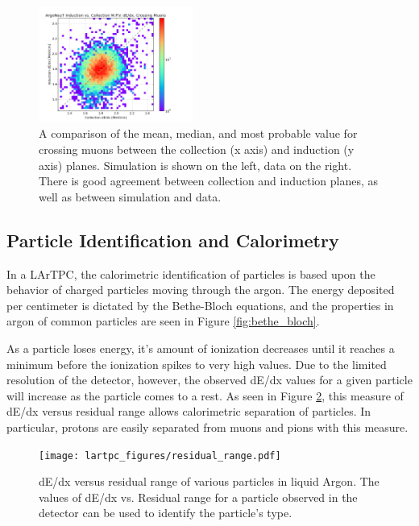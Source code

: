 \begin{figure}[p]
  \includegraphics[width=0.45\textwidth]{lartpc_figures/mpv_coll_vs_ind_data.png}
  \caption[Cross Plane Calibration Checks]{A comparison of the mean, median, and most probable value for crossing muons between the collection (x axis) and induction (y axis) planes.  Simulation is shown on the left, data on the right.  There is good agreement between collection and induction planes, as well as between simulation and data.}
  \label{fig:coll_ind_differences}
\end{figure}

\subsection{Particle Identification and Calorimetry}

In a LArTPC, the calorimetric identification of particles is based upon the behavior of charged particles moving through the argon.  The energy deposited per centimeter is dictated by the Bethe-Bloch equations, and the properties in argon of common particles are seen in Figure \ref{fig:bethe_bloch}.

As a particle loses energy, it's amount of ionization decreases until it reaches a minimum before the ionization spikes to very high values.  Due to the limited resolution of the detector, however, the observed dE/dx values for a given particle will increase as the particle comes to a rest.  As seen in Figure \ref{fig:residual_range}, this measure of dE/dx versus residual range allows calorimetric separation of particles.  In particular, protons are easily separated from muons and pions with this measure.

\begin{figure}[tb]
  \centering
  \texttt{[image: lartpc\_figures/residual\_range.pdf]}
  \caption[Residual Range]{dE/dx versus residual range of various particles in liquid Argon.  The values of dE/dx vs. Residual range for a particle observed in the detector can be used to identify the particle's type.}
  \label{fig:residual_range}
\end{figure}

